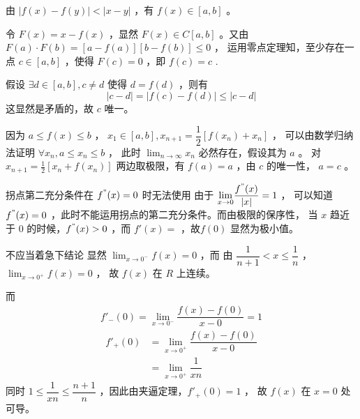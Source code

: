 \begin{Answer}
    由 $ |f(x)-f(y)|<|x-y| $ ，有 $ f(x)\in[a,b] $ 。

    令 $ F(x) = x - f(x) $ ，显然 $ F(x)\in C[a,b] $ 。又由 $ F(a)\cdot F(b) = [a-f(a)][b-f(b)]\leq 0 $ ，
    运用零点定理知，至少存在一点 $ c\in [a,b] $ ，使得 $ F(c) = 0 $ ，即 $ f(c) = c $ .

    假设 $ \exists d\in[a,b], c\neq d $ 使得 $ d = f(d) $ ，则有$$
        |c-d| = |f(c) - f(d)| \leq |c - d|
    $$ 这显然是矛盾的，故 $ c $ 唯一。

    因为 $ a \leq f(x) \leq b $ ， $ x_1 \in [a,b] , x_{n+1} = \dfrac{1}{2}[f(x_n)+x_n]  $ ，
    可以由数学归纳法证明 $ \forall x_n, a\leq x_n \leq b $ ，
    此时 $ {\displaystyle\lim_{n\rightarrow \infty}}x_n $ 必然存在，假设其为 $ a $ 。
    对 $ x_{n+1} = \frac12[x_n+f(x_n)] $ 两边取极限，有 $ f(a) = a $ ，由 $ c $ 的唯一性，
    $ a = c $ 。
\end{Answer}

\begin{answer}[C2T1]{拐点第二充分条件在 $ f^"(x) = 0 $ 时无法使用}
    由于 $ \displaystyle {\displaystyle\lim_{x\rightarrow 0}}\dfrac{f^"(x)}{|x|} = 1 $ ，
    可以知道 $ f^"(x) = 0 $ ，此时不能运用拐点的第二充分条件。而由极限的保序性，
    当 $ x $ 趋近于 $ 0 $ 的时候，$ f^"(x)>0 $ ，而 $ f'(x) = $ ，故$ f(0) $ 显然为极小值。
\end{answer}

\begin{answer}[C2T8]{不应当着急下结论}
    显然 $ {\displaystyle\lim_{x\rightarrow 0^-}}f(x) = 0 $ ，而
    由 $ \dfrac{1}{n+1} < x \leq \dfrac{1}{n} $ ， $ {\displaystyle\lim_{x\rightarrow 0^+}}f(x)=0 $ ，
    故 $ f(x) $ 在 $ R $ 上连续。
    
    而\begin{equation*}
        \begin{aligned}
            f'_-(0) = {\displaystyle\lim_{x\rightarrow 0^-}}\dfrac{f(x)-f(0)}{x-0} = 1
        \end{aligned}
    \end{equation*}
    \begin{equation*}
        \begin{aligned}
            f'_+(0) &= {\displaystyle\lim_{x\rightarrow 0^+}}
            \dfrac{f(x)-f(0)}{x - 0} \\&= {\displaystyle\lim_{x\rightarrow 0^+}}
            \dfrac{1}{xn}
        \end{aligned}
    \end{equation*}
    同时 $ 1\leq \dfrac{1}{xn} \leq \dfrac{n+1}{n} $ ，因此由夹逼定理，$ f'_+(0) = 1 $ ，
    故 $ f(x) $ 在 $ x=0 $ 处可导。
\end{answer}

